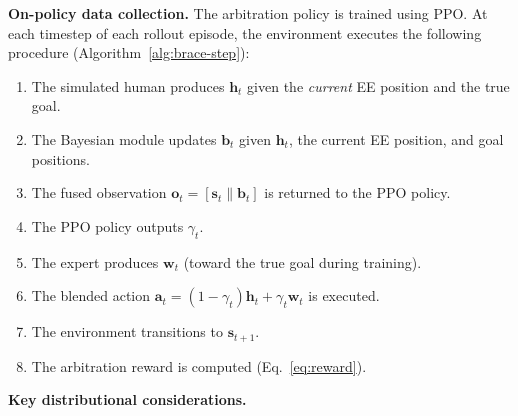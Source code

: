\documentclass[11pt]{article}
\newcommand{\bvec}{\mathbf{b}_t}
\newcommand{\svec}{\mathbf{s}_t}
\newcommand{\hvec}{\mathbf{h}_t}
\newcommand{\wvec}{\mathbf{w}_t}
\newcommand{\avec}{\mathbf{a}_t}
\begin{document}
\textbf{On-policy data collection.}
The arbitration policy is trained using PPO.
At each timestep of each rollout episode, the environment executes the following procedure (Algorithm~\ref{alg:brace-step}):
\begin{enumerate}
    \item The simulated human produces $\hvec$ given the \emph{current} EE position and the true goal.
    \item The Bayesian module updates $\bvec$ given $\hvec$, the current EE position, and goal positions.
    \item The fused observation $\mathbf{o}_t = [\svec \| \bvec]$ is returned to the PPO policy.
    \item The PPO policy outputs $\gamma_t$.
    \item The expert produces $\wvec$ (toward the true goal during training).
    \item The blended action $\avec = (1 - \gamma_t)\hvec + \gamma_t \wvec$ is executed.
    \item The environment transitions to $\mathbf{s}_{t+1}$.
    \item The arbitration reward is computed (Eq.~\ref{eq:reward}).
\end{enumerate}

\textbf{Key distributional considerations.}
\end{document}
